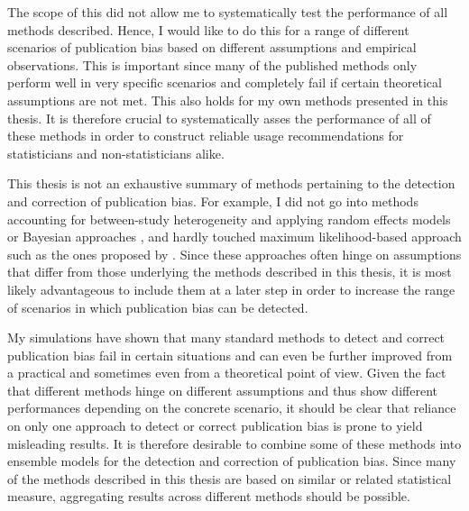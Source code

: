 \begin{description}[leftmargin=!,labelwidth=\widthof{\bfseries $\boldsymbol{E_4}$}]
    \item [Systematic evaluation of performance] The scope of this did not allow me to systematically test the performance of all methods described. Hence, I would like to do this for a range of different scenarios of publication bias based on different assumptions and empirical observations. This is important since many of the published methods only perform well in very specific scenarios and completely fail if certain theoretical assumptions are not met. This also holds for my own methods presented in this thesis. It is therefore crucial to systematically asses the performance of all of these methods in order to construct reliable usage recommendations for statisticians and non-statisticians alike.\\
    \item[Extend assessment to additional methods] This thesis is not an exhaustive summary of methods pertaining to the detection and correction of publication bias. For example, I did not go into methods accounting for between-study heterogeneity and applying random effects models \citep{piao_copaslike_2018} or Bayesian approaches \citep{cleary_application_1997, andrews_identification_2017}, and hardly touched maximum likelihood-based approach such as the ones proposed by \citet{copas_what_1999}. Since these approaches often hinge on assumptions that differ from those underlying the methods described in this thesis, it is most likely advantageous to include them at a later step in order to increase the range of scenarios in which publication bias can be detected.\\
    \item [Creating ensemble models] My simulations have shown that many standard methods to detect and correct publication bias fail in certain situations and can even be further improved from a practical and sometimes even from a theoretical point of view. Given the fact that different methods hinge on different assumptions and thus show different performances depending on the concrete scenario, it should be clear that reliance on only one approach to detect or correct publication bias is prone to yield misleading results. It is therefore desirable to combine some of these methods into ensemble models for the detection and correction of publication bias. Since many of the methods described in this thesis are based on similar or related statistical measure, aggregating results across different methods should be possible.
\end{description}
